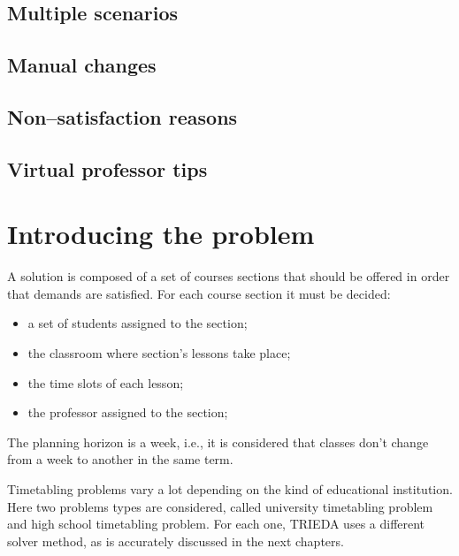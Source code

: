 \subsection{Multiple scenarios}
\label{subsec:scenarios}


\subsection{Manual changes}
\label{subsec:manual}


\subsection{Non--satisfaction reasons}
\label{subsec:reasons}


\subsection{Virtual professor tips}
\label{subsec:tips}





\section{Introducing the problem}
\label{sec:deftrieda}


A solution is composed of a set of courses sections that should be offered in order that demands are satisfied. For each course section it must be decided:

\begin{itemize}
\item a set of students assigned to the section;
\item the classroom where section's lessons take place;
\item the time slots of each lesson;
\item the professor assigned to the section;
\end{itemize}

The planning horizon is a week, i.e., it is considered that classes don't change from a week to another in the same term.
 
Timetabling problems vary a lot depending on the kind of educational institution. Here two problems types are considered, called university timetabling problem and high school timetabling problem. For each one, TRIEDA uses a different solver method, as is accurately discussed in the next chapters.


